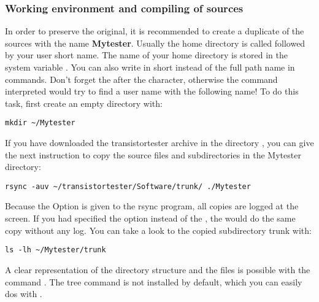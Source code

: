 \subsubsection{Working environment and compiling of sources}
\label{sec:Arbeitsumgebung}
In order to preserve the original, it is recommended to create a duplicate
of the sources with the name \textbf{Mytester}.
Usually the home directory is called  followed by your user short name.
The name of your home directory is stored in the system variable .
You can also write \lname{\textasciitilde/} in short instead of the full path name in commands. 
Don't forget the \lname{/} after the \lname{\textasciitilde} character, otherwise the command
interpreted would try to find a user name with the following name!
To do this task, first create an empty directory with: 
\begin{large} \vspace{-0.4em} \begin{verbatim}
mkdir ~/Mytester
\end{verbatim} \end{large}
If you have downloaded the transistortester archive in the directory ,
you can give the next instruction to copy the source files and subdirectories
in the Mytester directory:
\begin{large} \vspace{-0.4em} \begin{verbatim}
rsync -auv ~/transistortester/Software/trunk/ ./Mytester
\end{verbatim} \end{large}
Because the  Option is given to the rsync program, all
copies are logged at the screen.
If you had specified the  option instead of the ,
the  would do the same copy without any log.
You can take a look to the copied subdirectory trunk with:
\begin{large} \vspace{-0.4em} \begin{verbatim}
ls -lh ~/Mytester/trunk
\end{verbatim} \end{large}
A clear representation of the directory structure and the files is possible with the
command .
The tree command is not installed by default, which you can easily dos
with .\\

